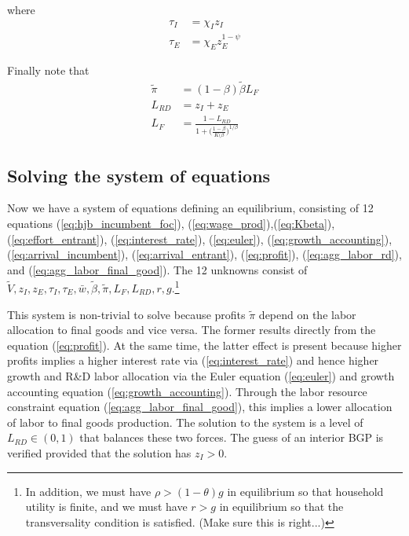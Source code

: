 \documentclass[12pt,english]{article}
\theoremstyle{remark}
\begin{document}
where
\begin{align}
	\tau_I &= \chi_I z_I \label{eq:arrival_incumbent}\\
	\tau_E &= \chi_E z_E^{1-\psi} \label{eq:arrival_entrant}
\end{align}

Finally note that
\begin{align}
	\tilde{\pi} &= (1-\beta)\tilde{\beta}L_F \label{eq:profit}\\
	L_{RD} &= z_I + z_E  \label{eq:agg_labor_rd}\\
	L_F &= \frac{1-L_{RD}}{1+\big(\frac{1-\beta}{K(\beta}\big)^{1/\beta}} \label{eq:agg_labor_final_good}
\end{align}

\subsection{Solving the system of equations}

Now we have a system of equations defining an equilibrium, consisting of 12 equations (\ref{eq:hjb_incumbent_foc}), (\ref{eq:wage_prod}),(\ref{eq:Kbeta}), (\ref{eq:effort_entrant}), (\ref{eq:interest_rate}), (\ref{eq:euler}), (\ref{eq:growth_accounting}),(\ref{eq:arrival_incumbent}), (\ref{eq:arrival_entrant}), (\ref{eq:profit}), (\ref{eq:agg_labor_rd}), and (\ref{eq:agg_labor_final_good}). The 12 unknowns consist of \linebreak $\tilde{V},z_I,z_E,\tau_I,\tau_E,\bar{w},\tilde{\beta},\tilde{\pi}, L_F, L_{RD}, r, g$.\footnote{In addition, we must have $\rho > (1-\theta)g$ in equilibrium so that household utility is finite, and we must have $r > g$ in equilibrium so that the transversality condition is satisfied. (Make sure this is right...)}

This system is non-trivial to solve because profits $\tilde{\pi}$ depend on the labor allocation to final goods and vice versa. The former results directly from the equation (\ref{eq:profit}). At the same time, the latter effect is present because higher profits implies a higher interest rate via (\ref{eq:interest_rate}) and hence higher growth and R\&D labor allocation via the Euler equation (\ref{eq:euler}) and growth accounting equation (\ref{eq:growth_accounting}). Through the labor resource constraint equation (\ref{eq:agg_labor_final_good}), this implies a lower allocation of labor to final goods production. The solution to the system is a level of $L_{RD} \in (0,1)$ that balances these two forces. The guess of an interior BGP is verified provided that the solution has $z_I > 0$. 
\end{document}
